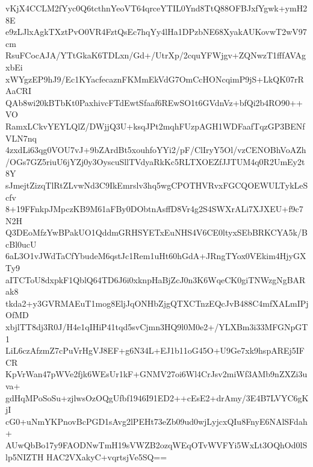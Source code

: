 vKjX4CCLM2fYyc0Q6tcthnYeoVT64qrceYTIL0Ynd8TtQ88OFBJxfYgwk+ymH28E
e9zLJlxAgkTXztPvO0VR4FztQsEc7hqYy4lHa1DPzbNE68XyakAUKovwT2wV97cm
RsuFCocAJA/YTtGkaK6TDLxn/Gd+/UtrXp/2cquYFWjgv+ZQNwzT1fffAVAgxbEi
xWYgzEP9hJ9/Ec1KYacfecaznFKMmEkVdG7OmCcHONcqimP9jS+LkQK07rRAaCRI
QAb8wi20kBTbKt0PaxhivcFTdEwtSfaaf6REwSO1t6GVdnVz+bfQi2b4RO90++VO
RamxLCkvYEYLQlZ/DWjjQ3U+ksqJPt2mqhFUzpAGH1WDFaafTqzGP3BENfVLN7nq
4zxdLi63qg0VOU7vJ+9bZArdBt5xouhfoYYi2/pF/ClIryY5Ol/vzCENOBhVoAZh
/OGs7GZ5riuU6jYZj0y3OyscuSllTVdyaRkKc5RLTXOEZfJJTUM4q0R2UmEy2t8Y
sJmejtZizqTlRtZLvwNd3C9IkEmrslv3hq5wgCPOTHVRvxFGCQOEWULTykLeScfv
8+19FFnkpJMpczKB9M61aFBy0DObtnAsffD8Vr4g2S4SWXrALi7XJXEU+f9c7N2H
Q3DEoMfzYwBPakUO1QddmGRHSYETxEuNHS4V6CE0ltyxSEbBRKCYA5k/BcBl0ucU
6aL3O1vJWdTaCfYbudeM6qstJc1Rem1uHt60hGdA+JRngTYox0VEkim4HjyGXTy9
aITCToU8dxpkF1QblQ64TD6J6i0xknpHaBjZcJ0n3K6WqeCK0giTNWzgNgBARak8
tkda2+y3GVRMAEuT1mog8EljJqONHbZjgQTXCTnzEQcJvB488C4mfXALmIPjOfMD
xbjlTT8dj3R0J/H4e1qIHiP41tqd5svCjmn3HQ9l0M0e2+/YLXBm3i33MFGNpGT1
LiL6czAfzmZ7cPuVrHgVJ8EF+g6N34L+EJ1b11oG45O+U9Ge7xk9hspAREj5IFCR
KpVrWan47pWVe2fjk6WEsUr1kF+GNMV27oi6Wl4CrJsv2miWf3AMb9nZXZi3uva+
gdHqMPoSoSu+zjlwsOzOQgUfbf1946I91ED2++cEsE2+drAmy/3E4B7LVYC6gKjI
cG0+uNmYKPnovBcPGD1sAvg2lPEHt73eZb09ud0wjLyjcxQIu8FnyE6NAlSFdah+
AUwQbBo17y9FAODNwTmH19sVWZB2ozqWEqOTvWVFYi5WxLt3OQhOd0lSlp5NIZTH
HAC2VXakyC+vqrtsjVe5SQ==
